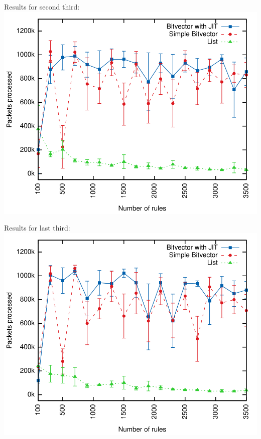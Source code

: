\documentclass[xcolor=x11names,compress]{beamer}
\renewcommand{\(}{\begin{columns}}
\renewcommand{\)}{\end{columns}}
\newcommand{\<}[1]{\begin{column}{#1}}
\renewcommand{\>}{\end{column}}
\begin{document}
\begin{frame}[noframenumbering]
  Results for second third:
  \includegraphics[height=0.9\textheight]{figures/eval_a}
\end{frame}

\begin{frame}[noframenumbering]
  Results for last third:
  \includegraphics[height=0.9\textheight]{figures/eval_w}
\end{frame}
\end{document}
